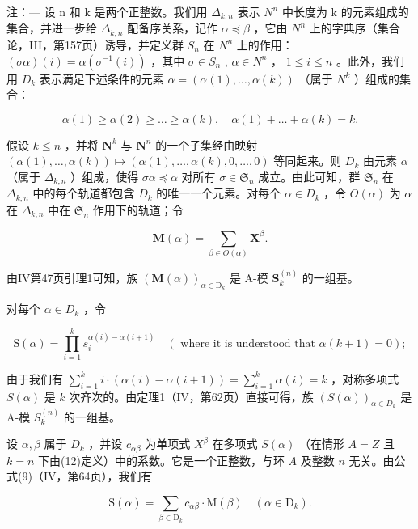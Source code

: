 注：--- 设 n 和 k 是两个正整数。我们用 \(\Delta_{k,n}\) 表示 \(N^{n}\) 中长度为 k 的元素组成的集合，并进一步给 \(\Delta_{k,n}\) 配备序关系，记作 \(\alpha \preccurlyeq \beta\) ，它由 \(N^{n}\) 上的字典序（集合论，III，第157页）诱导，并定义群 \(S_{n}\) 在 \(N^{n}\) 上的作用： \((\sigma\alpha)(i) = \alpha(\sigma^{-1}(i))\) ，其中 \(\sigma \in S_{n}\) , \(\alpha \in N^{n}\) ， \(1 \leqslant i \leqslant n\) 。此外，我们用 \(D_{k}\) 表示满足下述条件的元素 \(\alpha = (\alpha(1), \ldots, \alpha(k))\) （属于 \(N^{k}\) ）组成的集合：

\[
\alpha (1) \geqslant \alpha (2) \geqslant \dots \geqslant \alpha (k), \quad \alpha (1) + \dots + \alpha (k) = k.
\]

假设 \(k \leqslant n\) ，并将 \(\mathbf{N}^k\) 与 \(\mathbf{N}^n\) 的一个子集经由映射 \((\alpha(1), \ldots, \alpha(k)) \mapsto (\alpha(1), \ldots, \alpha(k), 0, \ldots, 0)\) 等同起来。则 \(D_k\) 由元素 \(\alpha\) （属于 \(\Delta_{k,n}\) ）组成，使得 \(\sigma \alpha \preccurlyeq \alpha\) 对所有 \(\sigma \in \mathfrak{S}_n\) 成立。由此可知，群 \(\mathfrak{S}_n\) 在 \(\Delta_{k,n}\) 中的每个轨道都包含 \(D_k\) 的唯一一个元素。对每个 \(\alpha \in D_k\) ，令 \(O(\alpha)\) 为 \(\alpha\) 在 \(\Delta_{k,n}\) 中在 \(\mathfrak{S}_n\) 作用下的轨道；令

\[
\mathbf {M} (\alpha) = \sum_ {\beta \in O (\alpha)} \mathbf {X} ^ {\beta}.\tag{11}
\]

由IV第47页引理1可知，族 \((\mathbf{M}(\alpha))_{\alpha \in \mathrm{D}_k}\) 是 A-模 \(\mathbf{S}_k^{(n)}\) 的一组基。

对每个 \(\alpha \in D_k\) ，令

\[
\mathrm{S} (\alpha) = \prod_ {i = 1} ^ {k} s _ {i} ^ {\alpha (i) - \alpha (i + 1)} \quad (\text { where   it   is   understood   that } \alpha (k + 1) = 0);\tag{12}
\]

由于我们有 \(\sum_{i=1}^{k} i \cdot (\alpha(i) - \alpha(i+1)) = \sum_{i=1}^{k} \alpha(i) = k\) ，对称多项式 \(S(\alpha)\) 是 \(k\) 次齐次的。由定理1（IV，第62页）直接可得，族 \((S(\alpha))_{\alpha \in D_k}\) 是 A-模 \(S_k^{(n)}\) 的一组基。

设 \(\alpha, \beta\) 属于 \(D_k\) ，并设 \(c_{\alpha\beta}\) 为单项式 \(X^\beta\) 在多项式 \(S(\alpha)\) （在情形 \(A = Z\) 且 \(k = n\) 下由(12)定义）中的系数。它是一个正整数，与环 \(A\) 及整数 \(n\) 无关。由公式(9)（IV，第64页），我们有

\[
\mathrm{S} (\alpha) = \sum_ {\beta \in \mathrm{D} _ {k}} c _ {\alpha \beta} \cdot \mathrm{M} (\beta) \quad (\alpha \in \mathrm{D} _ {k}).\tag{13}
\]

